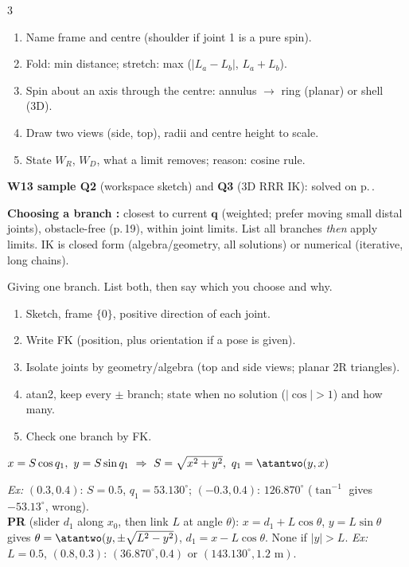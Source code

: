 \begin{multicols}{3}
\begin{recipe}
\label{w3:wsrecipe}
\begin{enumerate}
\item Name frame and centre (shoulder if joint 1 is a pure spin).
\item Fold: min distance; stretch: max ($|L_a-L_b|$, $L_a+L_b$).
\item Spin about an axis through the centre: annulus $\to$ ring (planar) or shell (3D).
\item Draw two views (side, top), radii and centre height to scale.
\item State $W_R$, $W_D$, what a limit removes; reason: cosine rule.
\end{enumerate}
\end{recipe}
\textbf{W13 sample Q2} (workspace sketch) and \textbf{Q3} (3D RRR IK): solved on p.\,\pageref{p:SAMPLE}.

\textbf{Choosing a branch :} closest to current $\mathbf q$ (weighted; prefer moving small distal joints), obstacle-free (p.\,19), within joint limits. List all branches \emph{then} apply limits. IK is closed form (algebra/geometry, all solutions) or numerical (iterative, long chains).
\begin{trap}Giving one branch. List both, then say which you choose and why.\end{trap}

\begin{recipe}
\begin{enumerate}
\item Sketch, frame $\{0\}$, positive direction of each joint.
\item Write FK (position, plus orientation if a pose is given).
\item Isolate joints by geometry/algebra (top and side views; planar 2R triangles).
\item atan2, keep every $\pm$ branch; state when no solution ($|\cos|>1$) and how many.
\item Check one branch by FK.
\end{enumerate}
\end{recipe}
\begin{fbx}[RP: polar \pg{24}]
$x=S\cos q_1,\ y=S\sin q_1\ \Rightarrow\ S=\sqrt{x^2+y^2},\ q_1=\atantwo(y,x)$
\end{fbx}
\textit{Ex:} $(0.3,0.4)$: $S=0.5$, $q_1=53.130^\circ$; $(-0.3,0.4)$: $126.870^\circ$ ($\tan^{-1}$ gives $-53.13^\circ$, wrong). \chk\\
\textbf{PR} (slider $d_1$ along $x_0$, then link $L$ at angle $\theta$): $x=d_1+L\cos\theta$, $y=L\sin\theta$ gives
$\theta=\atantwo(y,\pm\sqrt{L^2-y^2})$, $d_1=x-L\cos\theta$. None if $|y|>L$. \textit{Ex:} $L=0.5$, $(0.8,0.3)$: $(36.870^\circ,0.4)$ or $(143.130^\circ,1.2\text{ m})$. \chk


\end{multicols}
